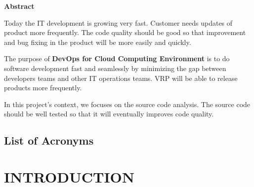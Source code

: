 \documentclass[a4paper,oneside,1,english1pt]{report}
\begin{document}
\begin{center}
	\textbf{\Huge Abstract}\\[2cm]
\end{center}
\par Today the IT development is growing very fast. Customer needs updates of product more frequently. The code quality should be good so that improvement and bug fixing in the product will be more easily and quickly. 
\par The purpose of \textbf{DevOps for Cloud Computing Environment} is to do software development fast and seamlessly by minimizing the gap between developers teams and other IT operations teams. \ac{VRP} will be able to release products more frequently.
\par In this project's context, we focuses on the source code analysis. The source code should be well tested so that it will eventually improves code quality.






\tableofcontents

\listoffigures
{}

\newpage





\section*{\Huge List of Acronyms}
\begin{acronym}[AWGN]
\end{acronym}

\clearpage
{} %
\chapter{\uppercase{Introduction}}	
\end{document}
